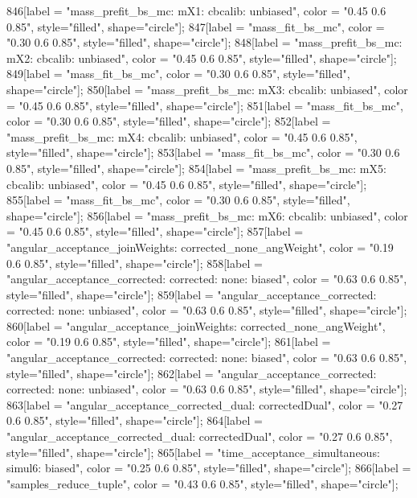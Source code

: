 {	846[label = "mass_prefit_bs_mc\nmassbin: mX1\nmassmodel: cbcalib\ntrigger: unbiased", color = "0.45 0.6 0.85", style="filled", shape="circle"];
	847[label = "mass_fit_bs_mc", color = "0.30 0.6 0.85", style="filled", shape="circle"];
	848[label = "mass_prefit_bs_mc\nmassbin: mX2\nmassmodel: cbcalib\ntrigger: unbiased", color = "0.45 0.6 0.85", style="filled", shape="circle"];
	849[label = "mass_fit_bs_mc", color = "0.30 0.6 0.85", style="filled", shape="circle"];
	850[label = "mass_prefit_bs_mc\nmassbin: mX3\nmassmodel: cbcalib\ntrigger: unbiased", color = "0.45 0.6 0.85", style="filled", shape="circle"];
	851[label = "mass_fit_bs_mc", color = "0.30 0.6 0.85", style="filled", shape="circle"];
	852[label = "mass_prefit_bs_mc\nmassbin: mX4\nmassmodel: cbcalib\ntrigger: unbiased", color = "0.45 0.6 0.85", style="filled", shape="circle"];
	853[label = "mass_fit_bs_mc", color = "0.30 0.6 0.85", style="filled", shape="circle"];
	854[label = "mass_prefit_bs_mc\nmassbin: mX5\nmassmodel: cbcalib\ntrigger: unbiased", color = "0.45 0.6 0.85", style="filled", shape="circle"];
	855[label = "mass_fit_bs_mc", color = "0.30 0.6 0.85", style="filled", shape="circle"];
	856[label = "mass_prefit_bs_mc\nmassbin: mX6\nmassmodel: cbcalib\ntrigger: unbiased", color = "0.45 0.6 0.85", style="filled", shape="circle"];
	857[label = "angular_acceptance_joinWeights\nwflag: corrected_none_angWeight", color = "0.19 0.6 0.85", style="filled", shape="circle"];
	858[label = "angular_acceptance_corrected\nangacc: corrected\ncsp: none\ntrigger: biased", color = "0.63 0.6 0.85", style="filled", shape="circle"];
	859[label = "angular_acceptance_corrected\nangacc: corrected\ncsp: none\ntrigger: unbiased", color = "0.63 0.6 0.85", style="filled", shape="circle"];
	860[label = "angular_acceptance_joinWeights\nwflag: corrected_none_angWeight", color = "0.19 0.6 0.85", style="filled", shape="circle"];
	861[label = "angular_acceptance_corrected\nangacc: corrected\ncsp: none\ntrigger: biased", color = "0.63 0.6 0.85", style="filled", shape="circle"];
	862[label = "angular_acceptance_corrected\nangacc: corrected\ncsp: none\ntrigger: unbiased", color = "0.63 0.6 0.85", style="filled", shape="circle"];
	863[label = "angular_acceptance_corrected_dual\nstep: correctedDual", color = "0.27 0.6 0.85", style="filled", shape="circle"];
	864[label = "angular_acceptance_corrected_dual\nstep: correctedDual", color = "0.27 0.6 0.85", style="filled", shape="circle"];
	865[label = "time_acceptance_simultaneous\ntimeacc: simul6\ntrigger: biased", color = "0.25 0.6 0.85", style="filled", shape="circle"];
	866[label = "samples_reduce_tuple", color = "0.43 0.6 0.85", style="filled", shape="circle"];
}

